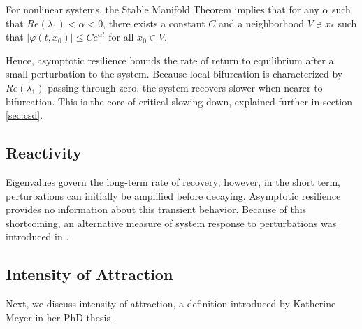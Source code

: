 For nonlinear systems, the Stable Manifold Theorem implies 
that for any $\alpha$ such that $Re(\lambda_1) < \alpha < 0$, there exists a constant $C$ and a neighborhood $V \ni x_\ast$ such that  $|\varphi(t,x_0)| \leq Ce^{\alpha t}$ for all $x_0 \in V$.

 
 Hence, asymptotic resilience bounds the rate of return to equilibrium after a small perturbation to the system. Because local bifurcation is characterized by $Re(\lambda_1)$ passing through zero, the system recovers slower when nearer to bifurcation. This is the core of critical slowing down, explained further in section \ref{sec:csd}.

\subsection{Reactivity}
Eigenvalues govern the long-term rate of recovery; however, in the short term, perturbations can initially be amplified before decaying. Asymptotic resilience provides no information about this transient behavior. Because of this shortcoming, an alternative measure of system response to perturbations was introduced in \cite{neubertAlternativesResilienceMeasuring1997a}. 

\begin{definition}
	
\end{definition}


\subsection{Intensity of Attraction}

Next, we discuss intensity of attraction, a definition introduced by Katherine Meyer in her PhD thesis \cite{meyerMetricPropertiesAttractors2019}. 



























